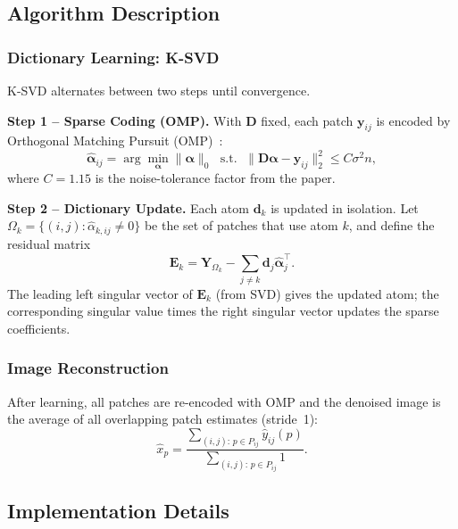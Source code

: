 \documentclass[conference]{IEEEtran}
\begin{document}
\subsection{Algorithm Description}

\subsubsection{Dictionary Learning: K-SVD}

K-SVD alternates between two steps until convergence.

\textbf{Step 1 -- Sparse Coding (OMP).}
With $\mathbf{D}$ fixed, each patch $\mathbf{y}_{ij}$ is encoded
by Orthogonal Matching Pursuit (OMP)~\cite{pati1993orthogonal}:
\begin{equation}
    \hat{\boldsymbol{\alpha}}_{ij} = \arg\min_{\boldsymbol{\alpha}}
    \|\boldsymbol{\alpha}\|_0 \;\text{ s.t. }\;
    \|\mathbf{D}\boldsymbol{\alpha} - \mathbf{y}_{ij}\|_2^2
    \leq C\sigma^2 n,
    \label{eq:omp}
\end{equation}
where $C = 1.15$ is the noise-tolerance factor from the paper.

\textbf{Step 2 -- Dictionary Update.}
Each atom $\mathbf{d}_k$ is updated in isolation.  Let
$\Omega_k = \{(i,j) : \hat{\alpha}_{k,ij} \neq 0\}$ be the set of
patches that use atom $k$, and define the residual matrix
\begin{equation}
    \mathbf{E}_k = \mathbf{Y}_{\Omega_k}
    - \sum_{j \neq k} \mathbf{d}_j \hat{\boldsymbol{\alpha}}_j^{\top}.
\end{equation}
The leading left singular vector of $\mathbf{E}_k$ (from SVD)
gives the updated atom; the corresponding singular value times the
right singular vector updates the sparse coefficients.

\subsubsection{Image Reconstruction}

After learning, all patches are re-encoded with OMP and the
denoised image is the average of all overlapping patch estimates
(stride~1):
\begin{equation}
    \hat{x}_p =
    \frac{\sum_{(i,j):\,p\in P_{ij}} \hat{y}_{ij}(p)}
         {\sum_{(i,j):\,p\in P_{ij}} 1}.
    \label{eq:avg}
\end{equation}

\subsection{Implementation Details}
\end{document}
